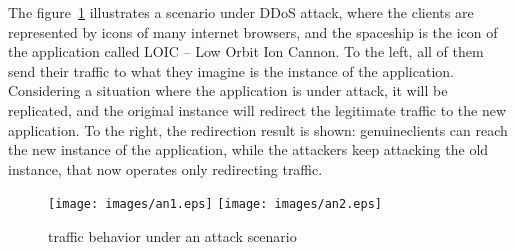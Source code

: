 The figure~\ref{fig:cen} illustrates a scenario under DDoS attack, where the clients are represented by icons of many internet browsers, and the spaceship is the icon of the application called LOIC -- Low Orbit Ion Cannon. To the left, all of them send their traffic to what they imagine is the instance of the application. Considering a situation where the application is under attack, it will be replicated, and the original instance will redirect the legitimate traffic to the new application. To the right, the redirection result is shown: genuineclients can reach the new instance of the application, while the attackers keep attacking the old instance, that now operates only redirecting traffic.


\begin{figure}[t!]
	\centering
	\texttt{[image: images/an1.eps]}
	\hskip 1cm
	\texttt{[image: images/an2.eps]}
	\caption{traffic behavior under an attack scenario}
	\label{fig:cen}
\end{figure}
